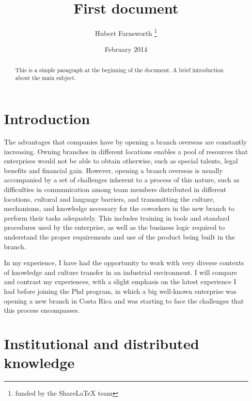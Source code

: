 \documentclass[12pt, letterpaper, twoside]{article}
\title{First document}
\author{Hubert Farnsworth \thanks{funded by the ShareLaTeX team}}
\date{February 2014}
\begin{document}
 
\begin{titlepage}
\maketitle
\end{titlepage}

\begin{abstract}
This is a simple paragraph at the beginning of the 
document. A brief introduction about the main subject.
\end{abstract}
 
 
\section{Introduction}

The advantages that companies have by opening a branch overseas are constantly increasing.
Owning branches in different locations enables a pool of resources that enterprises would not be able
to obtain otherwise, such as special talents, legal benefits and financial gain. However, 
opening a branch overseas is usually accompanied by a set of challenges inherent to a process of this nature, such as 
difficulties in communication among team members distributed in different locations, 
cultural and language barriers, and transmitting the culture, mechanisms, and knowledge necessary for the 
coworkers in the new branch to perform their tasks adequately. 
This includes training in tools and standard procedures used by the enterprise, as well as the
business logic required to understand the proper requirements and use of the product being built
in the branch.

In my experience, I have had the opportunity to work with very diverse contexts of knowledge and culture transfer in 
an industrial environment. I will compare and contrast my experiences, with a slight emphasis on the 
latest experience I had before joining the Phd program, in which a big well-known enterprise was 
opening a new branch in Costa Rica and was starting to face the challenges that this process encompasses.  




 




\section{Institutional and distributed knowledge}
 
\end{document}
